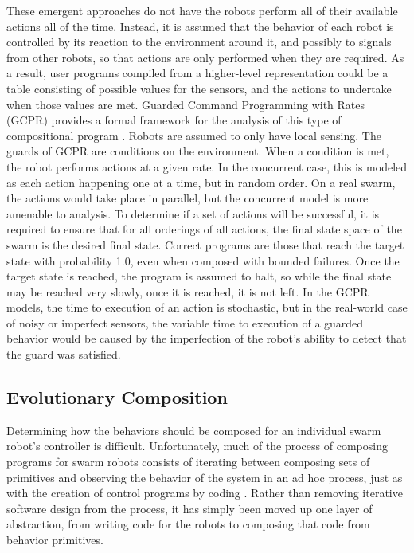 These emergent approaches do not have the robots perform all of their available actions all of the time. 
Instead, it is assumed that the behavior of each robot is controlled by its reaction to the environment around it, and possibly to signals from other robots, so that actions are only performed when they are required. 
As a result, user programs compiled from a higher-level representation could be a table consisting of possible values for the sensors, and the actions to undertake when those values are met.
Guarded Command Programming with Rates (GCPR) provides a formal framework for the analysis of this type of compositional program \citep{napp2011compositional}. 
Robots are assumed to only have local sensing.
The guards of GCPR are conditions on the environment.
When a condition is met, the robot performs actions at a given rate. 
In the concurrent case, this is modeled as each action happening one at a time, but in random order. 
On a real swarm, the actions would take place in parallel, but the concurrent model is more amenable to analysis. 
To determine if a set of actions will be successful, it is required to ensure that for all orderings of all actions, the final state space of the swarm is the desired final state. 
Correct programs are those that reach the target state with probability 1.0, even when composed with bounded failures. 
Once the target state is reached, the program is assumed to halt, so while the final state may be reached very slowly, once it is reached, it is not left. 
In the GCPR models, the time to execution of an action is stochastic, but in the real-world case of noisy or imperfect sensors, the variable time to execution of a guarded behavior would be caused by the imperfection of the robot's ability to detect that the guard was satisfied. 

\subsection{Evolutionary Composition} \label{section:Evolutionary_Composition}

Determining how the behaviors should be composed for an individual swarm robot's controller is difficult. 
Unfortunately, much of the process of composing programs for swarm robots consists of iterating between composing sets of primitives and observing the behavior of the system in an ad hoc process, just as with the creation of control programs by coding \citep{palmer2005behavioral}. 
Rather than removing iterative software design from the process, it has simply been moved up one layer of abstraction, from writing code for the robots to composing that code from behavior primitives. 

